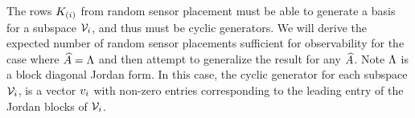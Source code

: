 The rows $K_{(i)}$ from random sensor placement must be able to generate a basis for a subspace $ \mathcal{V}_i $, and thus must be cyclic generators.  We will derive the expected number of random sensor placements sufficient for observability for the case where $ \widehat{A} = \Lambda $ and then attempt to generalize the result for any $ \widehat{A} $. Note $ \Lambda $ is a block diagonal Jordan form.  In this case, the cyclic generator for each subspace $ 
\mathcal{V}_i $, is a vector $ v_i $ with non-zero entries corresponding to the leading entry of the Jordan blocks of $ 
\mathcal{V}_i $. 

